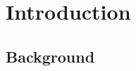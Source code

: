 \documentclass[a4paper,11pt]{article}
\begin{document}






\renewcommand{\listfigurename}{
  \section{List of figures}
}
\listoffigures
\cleardoublepage
\renewcommand{\listtablename}{
  \section{List of tables}
}
\listoftables
\cleardoublepage

\section{Introduction}
\subsection{Background}
\end{document}
